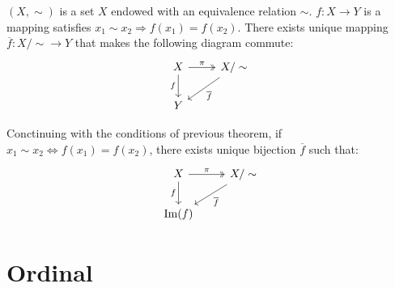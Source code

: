 \begin{theorem}
  \label{Mapping_Quotient_1}
  $(X, \sim)$ is a set $X$ endowed with an equivalence relation $\sim$. $f: X \to Y$ is a mapping satisfies $x_1 \sim x_2 \Rightarrow f(x_1) = f(x_2)$. There exists unique mapping $\overline{f}: X / \sim \to Y$ that makes the following diagram commute:
  \[
    \begin{tikzcd}
      X \arrow[two heads, r, "\pi"] \arrow[d, "f"'] 
      & X / \sim  \arrow[ld, "\overline{f}"]
      \\
      Y
    \end{tikzcd}
  \]
\end{theorem}




\begin{theorem}
  \label{Mapping_Quotient_2}
  Conctinuing with the conditions of previous theorem, if $x_1 \sim x_2 \Leftrightarrow f(x_1) = f(x_2)$, there exists unique bijection $\overline{f}$ such that:
  \[
    \begin{tikzcd}
      X \arrow[two heads, r, "\pi"] \arrow[d, "f"'] 
      & X / \sim  \arrow[ld, "\overline{f}"]
      \\
      \Im(f)
    \end{tikzcd}
  \]
\end{theorem}





\section{Ordinal}







